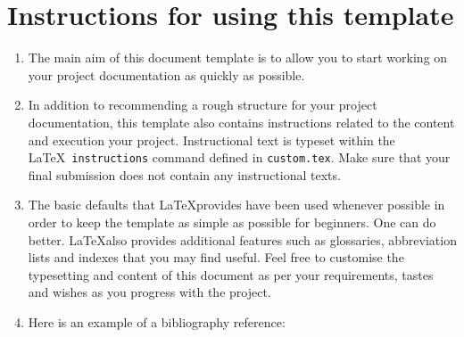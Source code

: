 \chapter*{Instructions for using this template}

\begin{enumerate}
    \item The main aim of this document template is to allow you to start working on your project documentation as quickly as possible.
    \item In addition to recommending a rough structure for your project documentation, this template also contains instructions related to the content and execution your project. Instructional text is typeset within the \LaTeX\ \texttt{instructions} command defined in \texttt{custom.tex}. Make sure that your final submission does not contain any instructional texts.
    \item The basic defaults that \LaTeX provides have been used whenever possible in order to keep the template as simple as possible for beginners. One can do better. \LaTeX also provides additional features such as glossaries, abbreviation lists and indexes that you may find useful. Feel free to customise the typesetting and content of this document as per your requirements, tastes and wishes as you progress with the project.
    \item Here is an example of a bibliography reference: \cite{larman_applyingUmlAndPatterns_2004}
\end{enumerate}

